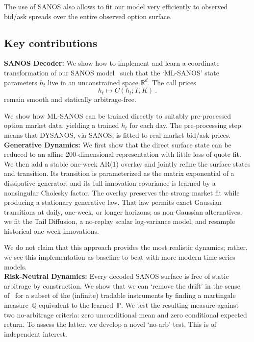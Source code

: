 \documentclass[11pt,a4paper]{article}
\newcommand{\R}{\mathbb{R}}
\newcommand{\Q}{\mathbb{Q}}
\renewcommand{\P}{\mathbb{P}}
\renewcommand{\Q}{\mathbb{Q}}
\begin{document}
The use of SANOS also allows to fit our model very efficiently to observed bid/ask spreads over the entire observed option surface.\\


\subsection*{Key contributions}

\noindent
\textbf{SANOS Decoder:}
    We show how to implement and learn a coordinate transformation of
    our SANOS model~\citep{SANOS2026}
    such that the `ML-SANOS' state parameters $h_t$ live in an unconstrained space
    $\R^{d}$.  The call
    prices 
    $$
        h_t \longmapsto C(h_t;T,K)  \ .
    $$    
    remain smooth and statically arbitrage-free.
    
    We show how ML-SANOS can be trained directly to suitably pre-processed 
    option market data, yielding a trained $h_t$ for each day.
    The pre-processing step means that DYSANOS, via SANOS, is fitted to real market bid/ask prices.\\

\noindent
\textbf{Generative Dynamics:}
    We first show that the direct surface state can be reduced to an
    affine 200-dimensional representation with little loss of quote fit.  We
    then add a stable one-week AR(1) overlay and jointly refine the surface
    states and transition.  Its transition is parameterized as the matrix
    exponential of a dissipative generator, and its full innovation
    covariance is learned by a nonsingular Cholesky factor.  The overlay
    preserves the strong market fit while producing a stationary generative
    law.  That law permits exact Gaussian transitions at daily, one-week, or
    longer horizons; as non-Gaussian alternatives, we fit the Tail Diffusion,
    a no-replay scalar log-variance model, and resample historical one-week
    innovations.
    
    We do not
    claim that this approach provides the most realistic dynamics; rather,
    we see this implementation as baseline to beat with more modern
    time series models.\\

    \noindent
\textbf{Risk-Neutral Dynamics:}
Every decoded SANOS surface is free of static arbitrage by construction.
We show that we can `remove the drift' in the sense of~\citet{removedrift} for a subset of the (infinite) tradable instruments
by finding a martingale measure~$\Q$ equivalent to the learned~$\P$.
We test the resulting measure against two no-arbitrage criteria: zero
unconditional mean and zero conditional expected return. To assess the latter, we develop a novel `no-arb' test.
This is of independent interest.
\end{document}
